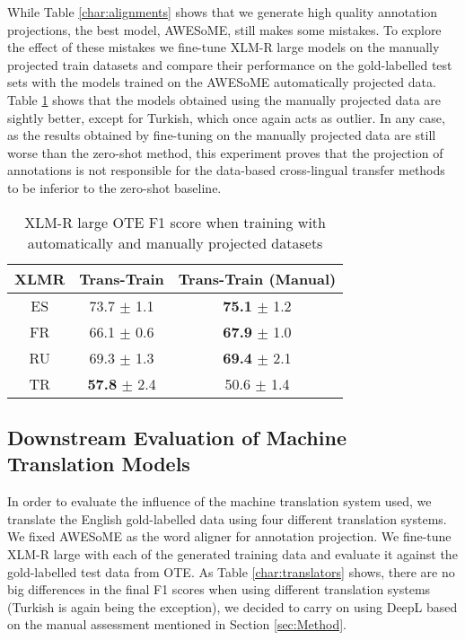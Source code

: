\documentclass[11pt]{article}
\begin{document}
While Table \ref{char:alignments} shows that we generate high quality annotation projections, the best model, AWESoME, still makes some mistakes. To explore the effect of these mistakes we fine-tune XLM-R large models on the manually projected train datasets and compare their performance on the gold-labelled test sets with the models trained on the AWESoME automatically projected data.
Table \ref{char:ManualvsAutomaticProjection} shows that the models obtained using the manually projected data are sightly better, except for Turkish, which once again acts as outlier. In any case, as the results obtained by fine-tuning on the manually projected data are still worse than the zero-shot method, this experiment proves that the projection of annotations is not responsible for the data-based cross-lingual transfer methods to be inferior to the zero-shot baseline.

\begin{table}[htbp]
  \centering
  \small
\begin{tabular}{c|cc}
XLMR & Trans-Train & Trans-Train (Manual) \\
\hline
ES & 73.7 $\pm$ 1.1 & \textbf{75.1} $\pm$ 1.2 \\
FR & 66.1 $\pm$ 0.6 & \textbf{67.9} $\pm$ 1.0 \\
RU & 69.3 $\pm$ 1.3 & \textbf{69.4} $\pm$ 2.1 \\
TR & \textbf{57.8} $\pm$ 2.4 & 50.6 $\pm$ 1.4 \\
\end{tabular}
  \caption{XLM-R large OTE F1 score when training with automatically and manually projected datasets}
  \label{char:ManualvsAutomaticProjection}
\end{table}

\subsection{Downstream Evaluation of Machine Translation Models}

In order to evaluate the influence of the machine translation system used, we translate the English gold-labelled data using four different translation systems. We fixed AWESoME as the word aligner for annotation projection. We fine-tune XLM-R large with each of the generated training data and evaluate it against the gold-labelled test data from OTE. As Table \ref{char:translators} shows, there are no big differences in the final F1 scores when using different translation systems (Turkish is again being the exception), we decided to carry on using DeepL based on the manual assessment mentioned in Section \ref{sec:Method}.  
\end{document}
